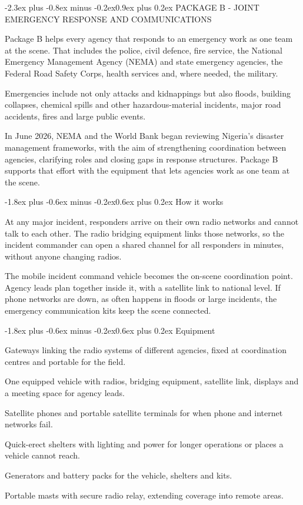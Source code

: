\documentclass[10pt,letterpaper]{article}
\makeatletter
\renewcommand\section{\@startsection{section}{1}{0pt}%
  {-2.3ex plus -0.8ex minus -0.2ex}{0.9ex plus 0.2ex}%
  {\color{SDSSNavy}\large\bfseries}}
\renewcommand\subsection{\@startsection{subsection}{2}{0pt}%
  {-1.8ex plus -0.6ex minus -0.2ex}{0.6ex plus 0.2ex}%
  {\color{SDSSNavy}\normalsize\bfseries}}
\newcommand{\EquipmentItem}[2]{\item[\textbf{#1}] #2}
\makeatother
\begin{document}
\section{PACKAGE B - JOINT EMERGENCY RESPONSE AND COMMUNICATIONS}

Package B helps every agency that responds to an emergency work as one team at the scene. That includes the police, civil defence, fire service, the National Emergency Management Agency (NEMA) and state emergency agencies, the Federal Road Safety Corps, health services and, where needed, the military.

Emergencies include not only attacks and kidnappings but also floods, building collapses, chemical spills and other hazardous-material incidents, major road accidents, fires and large public events.

In June 2026, NEMA and the World Bank began reviewing Nigeria's disaster management frameworks, with the aim of strengthening coordination between agencies, clarifying roles and closing gaps in response structures. Package B supports that effort with the equipment that lets agencies work as one team at the scene.

\subsection{How it works}

At any major incident, responders arrive on their own radio networks and cannot talk to each other. The radio bridging equipment links those networks, so the incident commander can open a shared channel for all responders in minutes, without anyone changing radios.

The mobile incident command vehicle becomes the on-scene coordination point. Agency leads plan together inside it, with a satellite link to national level. If phone networks are down, as often happens in floods or large incidents, the emergency communication kits keep the scene connected.

\subsection{Equipment}

\begin{description}[style=nextline,leftmargin=0pt,labelsep=0pt,itemsep=6pt]
  \EquipmentItem{Radio bridging equipment}{Gateways linking the radio systems of different agencies, fixed at coordination centres and portable for the field.}
  \EquipmentItem{Mobile incident command vehicle}{One equipped vehicle with radios, bridging equipment, satellite link, displays and a meeting space for agency leads.}
  \EquipmentItem{Emergency communication kits}{Satellite phones and portable satellite terminals for when phone and internet networks fail.}
  \EquipmentItem{Deployable coordination shelters}{Quick-erect shelters with lighting and power for longer operations or places a vehicle cannot reach.}
  \EquipmentItem{Standby power}{Generators and battery packs for the vehicle, shelters and kits.}
  \EquipmentItem{Mobile relay masts}{Portable masts with secure radio relay, extending coverage into remote areas.}
\end{description}
\end{document}
